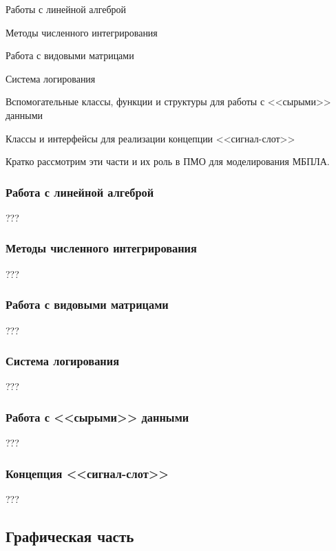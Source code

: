 \begin{mintemize}
\item Работы с линейной алгеброй
\item Методы численного интегрирования
\item Работа с видовыми матрицами
\item Система логирования
\item Вспомогательные классы, функции и структуры для работы с
    <<сырыми>> данными
\item Классы и интерфейсы для реализации концепции <<сигнал-слот>>
\end{mintemize}

Кратко рассмотрим эти части и их роль в ПМО для моделирования МБПЛА.

\subsubsection{Работа с линейной алгеброй}

???

\subsubsection{Методы численного интегрирования}

???

\subsubsection{Работа с видовыми матрицами}

???

\subsubsection{Система логирования}

???

\subsubsection{Работа с <<сырыми>> данными}

???

\subsubsection{Концепция <<сигнал-слот>>}

???

\newpage
\subsection{Графическая часть}

